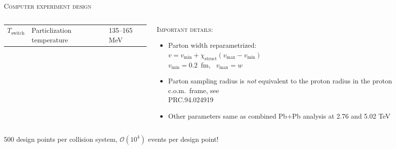 \documentclass[aspectratio=169]{beamer}
\newcommand{\X}{\chi_\text{struct}}
\begin{document}
\begin{frame}[t]{\scshape Computer experiment design}
\begin{columns}[T]
\begin{column}{.6\textwidth}
\begin{tabular}{lll}
        $T_\text{switch}$ & Particlization temperature         & 135--165 MeV    \\
      \end{tabular}
    \end{column}
    \begin{column}{.4\textwidth}
      \textcolor{theme}{\scshape Important details:}
      \smallskip
      \begin{itemize}
        \small
        \item Parton width reparametrized:\\[1ex]
          $v = v_\text{min} + \X(v_\text{max} - v_\text{min})$\\[1ex]
          $v_\text{min} = 0.2$~fm,~ $v_\text{max} = w$\\[1ex]
        \item Parton sampling radius is \emph{not} equivalent to the proton radius
          in the proton c.o.m.\ frame, see\\
          \textcolor{theme}{\scriptsize PRC.94.024919}\\[1ex]
        \item Other parameters same as combined Pb+Pb analysis at 2.76 and 5.02 TeV
      \end{itemize}
    \end{column}
  \end{columns}
  \begin{center}
    \color{theme}
    500 design points per collision system, $\mathcal{O}(10^4)$ events per design point!
  \end{center}
\end{frame}

\begin{frame}[plain]
\end{frame}
\end{document}
